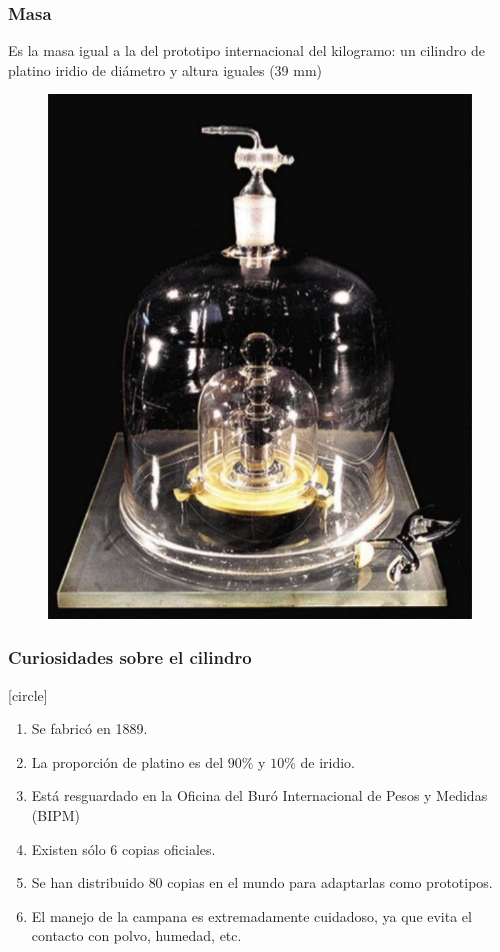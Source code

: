 \begin{frame}[plain]
\frametitle{Masa}
\hspace{-1cm}
\begin{minipage}{5.5cm}
Es la masa igual a la del prototipo internacional del kilogramo: un cilindro de platino iridio de diámetro y altura iguales (39 mm)
\end{minipage}
\hspace{0.75cm}
\begin{minipage}{5cm}
\begin{figure}
    \centering
    \includegraphics[scale=0.25]{./Imagenes/Masa_Prototipo.png}
\end{figure}
\end{minipage}
\end{frame}
\begin{frame}
\frametitle{Curiosidades sobre el cilindro}
[circle]
\begin{enumerate}[<+->]
\item Se fabricó en 1889.
\item La proporción de platino es del $90\%$ y $10\%$ de iridio.
\item Está resguardado en la Oficina del Buró Internacional de Pesos y Medidas (BIPM)
\item Existen sólo 6 copias oficiales.
\item Se han distribuido $80$ copias en el mundo para adaptarlas como prototipos.
\item El manejo de la campana es extremadamente cuidadoso, ya que evita el contacto con polvo, humedad, etc.
\end{enumerate}
\end{frame}
